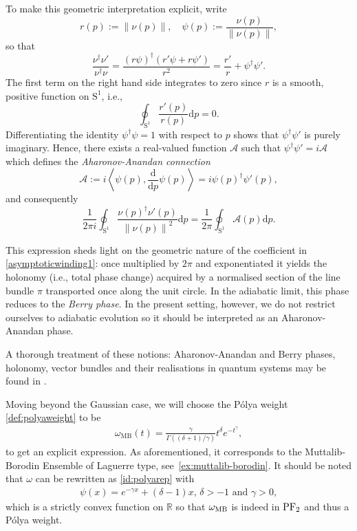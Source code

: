 \documentclass[pdflatex,sn-mathphys-num]{sn-jnl}
\theoremstyle{thmstyleone}
\numberwithin{equation}{section}
\newcommand{\Sp}{\mathrm{S}^{1}}
\newcommand{\R}{\mathbb{R}}
\begin{document}
To make this geometric interpretation explicit, write
\begin{equation}
    r(p):=\left\| \nu(p) \right\|,\quad \psi(p):=\frac{\nu(p)}{\left\| \nu(p) \right\|},
\end{equation}
so that
\begin{equation}
    \frac{\nu^{\dagger}\nu'}{\nu^{\dagger}\nu}=\frac{(r\psi)^{\dagger}(r'\psi+r\psi')}{r^{2}}=\frac{r'}{r}+\psi^{\dagger}\psi'.
\end{equation}
The first term on the right hand side integrates to zero since $r$ is a smooth, positive function on $\Sp$, i.e.,
\begin{equation}
    \oint_{\Sp}\frac{r'(p)}{r(p)}\mathrm{d}p=0.
\end{equation}
Differentiating the identity $\psi^{\dagger}\psi=1$ with respect to $p$ shows that $\psi^{\dagger}\psi'$ is purely imaginary. Hence, there exists a real-valued function $\mathcal{A}$ such that $\psi^{\dagger}\psi'=i\mathcal{A}$ which defines the \textit{Aharonov-Anandan connection}
\begin{equation}
    \mathcal{A}:=i\left<\psi(p),\frac{\mathrm{d}}{\mathrm{d}p}\psi(p)\right>=i\psi(p)^{\dagger}\psi'(p),
\end{equation}
and consequently
\begin{equation}
    \frac{1}{2\pi i}\oint_{\mathrm{S}^{1}}^{}\frac{\nu\left( p \right)^{\dagger}\nu'\left( p \right)}{\left\| \nu\left( p \right) \right\|^{2}}\mathrm{d}p=\frac{1}{2\pi}\oint_{\Sp}\mathcal{A}(p)\mathrm{d}p.
\end{equation}

This expression sheds light on the geometric nature of the coefficient in \eqref{asymptoticwinding1}: once multiplied by $2\pi$ and exponentiated it yields the holonomy (i.e., total phase change) acquired by a normalised section of the line bundle $\pi$ transported once along the unit circle.
In the adiabatic limit, this phase reduces to the \textit{Berry phase}. In the present setting, however, we do not restrict ourselves to adiabatic evolution so it should be interpreted as an Aharonov-Anandan phase.

A thorough treatment of these notions: Aharonov-Anandan and Berry phases, holonomy, vector bundles and their realisations in quantum systems may be found in \cite[Chap.~4-7,12]{BohmGeometricPhaseQuantum2003}. 
 
Moving beyond the Gaussian case, we will choose the P\'olya weight \eqref{def:polyaweight} to be
\begin{align}
    \omega_{\mathrm{MB}}\left(t\right)=\frac{\gamma}{\Gamma((\delta+1)/\gamma)}t^{\delta}e^{-t^{\gamma}},
\end{align}
to get an explicit expression. As aforementioned, it corresponds to the Muttalib-Borodin Ensemble of Laguerre type, see~\eqref{ex:muttalib-borodin}. It should be noted that $\omega$ can be rewritten as \eqref{id:polyarep} with
\begin{align*}
    \psi(x)=e^{-\gamma x}+(\delta-1)x,\,\delta>-1\text{ and }\gamma>0, 
\end{align*}
which is a strictly convex function on $\R$ so that $\omega_{\rm{MB}}$ is indeed in $\rm{PF}_{2}$ and thus a P\'olya weight.
\end{document}
